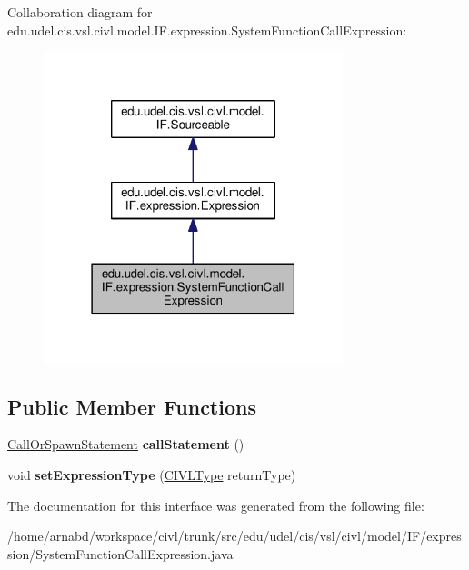 Collaboration diagram for edu.\+udel.\+cis.\+vsl.\+civl.\+model.\+I\+F.\+expression.\+System\+Function\+Call\+Expression\+:
\nopagebreak
\begin{figure}[H]
\begin{center}
\leavevmode
\includegraphics[width=247pt]{interfaceedu_1_1udel_1_1cis_1_1vsl_1_1civl_1_1model_1_1IF_1_1expression_1_1SystemFunctionCallExpression__coll__graph}
\end{center}
\end{figure}
\subsection*{Public Member Functions}
\begin{DoxyCompactItemize}
\item 
\hypertarget{interfaceedu_1_1udel_1_1cis_1_1vsl_1_1civl_1_1model_1_1IF_1_1expression_1_1SystemFunctionCallExpression_a930403f402097ff1526e50a7a8d1664f}{}\hyperlink{interfaceedu_1_1udel_1_1cis_1_1vsl_1_1civl_1_1model_1_1IF_1_1statement_1_1CallOrSpawnStatement}{Call\+Or\+Spawn\+Statement} {\bfseries call\+Statement} ()\label{interfaceedu_1_1udel_1_1cis_1_1vsl_1_1civl_1_1model_1_1IF_1_1expression_1_1SystemFunctionCallExpression_a930403f402097ff1526e50a7a8d1664f}

\item 
\hypertarget{interfaceedu_1_1udel_1_1cis_1_1vsl_1_1civl_1_1model_1_1IF_1_1expression_1_1SystemFunctionCallExpression_abb66e5ac6a589e0784a9f75349188c3b}{}void {\bfseries set\+Expression\+Type} (\hyperlink{interfaceedu_1_1udel_1_1cis_1_1vsl_1_1civl_1_1model_1_1IF_1_1type_1_1CIVLType}{C\+I\+V\+L\+Type} return\+Type)\label{interfaceedu_1_1udel_1_1cis_1_1vsl_1_1civl_1_1model_1_1IF_1_1expression_1_1SystemFunctionCallExpression_abb66e5ac6a589e0784a9f75349188c3b}

\end{DoxyCompactItemize}


The documentation for this interface was generated from the following file\+:\begin{DoxyCompactItemize}
\item 
/home/arnabd/workspace/civl/trunk/src/edu/udel/cis/vsl/civl/model/\+I\+F/expression/System\+Function\+Call\+Expression.\+java\end{DoxyCompactItemize}
